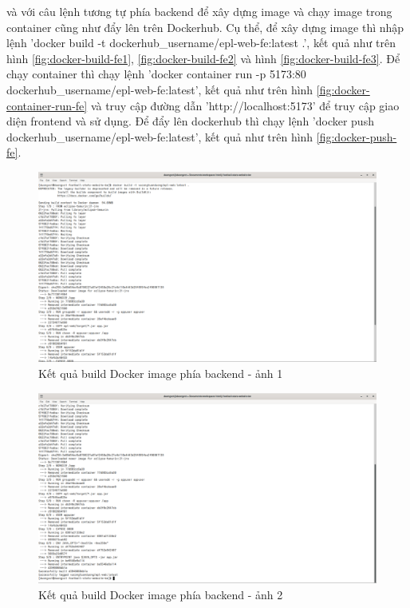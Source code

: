 \documentclass[../BTL.tex]{subfiles}
\begin{document}
và với câu lệnh tương tự phía backend để xây dựng image và chạy image trong container cũng như đẩy lên trên Dockerhub. Cụ thể, để xây dựng image thì nhập lệnh 'docker build -t dockerhub\_username/epl-web-fe:latest .', kết quả như trên hình \ref{fig:docker-build-fe1}, \ref{fig:docker-build-fe2} và hình \ref{fig:docker-build-fe3}. Để chạy container thì chạy lệnh 'docker container run -p 5173:80 dockerhub\_username/epl-web-fe:latest', kết quả như trên hình \ref{fig:docker-container-run-fe} và truy cập đường dẫn 'http://localhost:5173' để truy cập giao diện frontend và sử dụng. Để đẩy lên dockerhub thì chạy lệnh 'docker push dockerhub\_username/epl-web-fe:latest', kết quả như trên hình \ref{fig:docker-push-fe}.
\begin{figure}
    \centering
    \includegraphics[width=1\linewidth]{Hinhve/docker-build-be1.png}
    \caption{ Kết quả build Docker image phía backend - ảnh 1}
    \label{fig:docker-build-be1}
\end{figure}
\begin{figure}
    \centering
    \includegraphics[width=1\linewidth]{Hinhve/docker-build-be2.png}
    \caption{Kết quả build Docker image phía backend - ảnh 2}
    \label{fig:docker-build-be2}
\end{figure}
\end{document}
